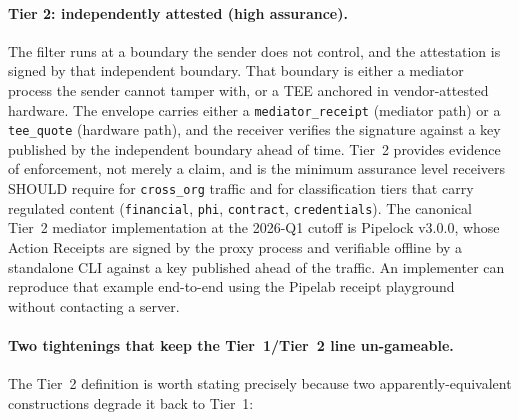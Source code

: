 \paragraph{Tier 2: independently attested (high assurance).}
The filter runs at a boundary the sender does not
control, and the attestation is signed by that
independent boundary. That boundary is either a
mediator process the sender cannot tamper with, or a
TEE anchored in vendor-attested hardware. The envelope carries either a
\texttt{mediator\_receipt} (mediator path) or a
\texttt{tee\_quote} (hardware path), and the receiver
verifies the signature against a key published by the
independent boundary ahead of time. Tier~2 provides
evidence of enforcement, not merely a claim, and is the
minimum assurance level receivers SHOULD require for
\texttt{cross\_org} traffic and for classification tiers
that carry regulated content (\texttt{financial},
\texttt{phi}, \texttt{contract}, \texttt{credentials}).
The canonical Tier~2 mediator implementation at the
2026-Q1 cutoff is Pipelock v3.0.0, whose Action
Receipts are signed by the proxy process and verifiable
offline by a standalone CLI against a key published
ahead of the traffic. An implementer can
reproduce that example end-to-end using the Pipelab receipt
playground~\cite{pipelab_playground} without contacting
a server.

\paragraph{Two tightenings that keep the Tier~1/Tier~2 line un-gameable.}
The Tier~2 definition is worth stating precisely
because two apparently-equivalent constructions
degrade it back to Tier~1:

